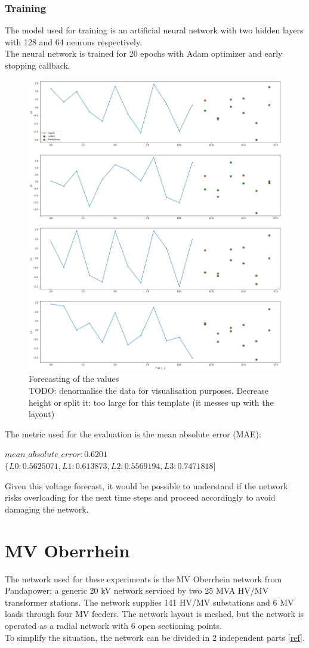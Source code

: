 \subsubsection{Training}
The model used for training is an artificial neural network with two hidden layers with 128 and 64 neurons respectively.\\
The neural network is trained for 20 epochs with Adam optimizer and early stopping callback.

\begin{figure}[H]
    \centering
    \includegraphics[width=.5\linewidth]{images/GYM-ANM/DATASET PLOTS/lines_forecasting.png}
    \caption[GYM-ANM forecasting]{Forecasting of the values \\
    TODO: denormalise the data for visualisation purposes. Decrease height or split it: too large for this template (it messes up with the layout)}
    \label{fig:net_sit3}
\end{figure}

\noindent The metric used for the evaluation is the mean absolute error (\gls{MAE}):
\begin{algorithmic}
\State $mean\_absolute\_error: 0.6201$
\State $\{L0:0.5625071, L1:0.613873 , L2:0.5569194, L3:0.7471818]$
\end{algorithmic}

\noindent Given this voltage forecast, it would be possible to understand if the network risks overloading for the next time steps and proceed accordingly to avoid damaging the network.



\section{MV Oberrhein}
\label{sec:MVober}
The network used for these experiments is the MV Oberrhein network from Pandapower; a generic 20 kV network serviced by two 25 MVA HV/MV transformer stations. The network supplies 141 HV/MV substations and 6 MV loads through four MV feeders. The network layout is meshed, but the network is operated as a radial network with 6 open sectioning points. \\
To simplify the situation, the network can be divided in 2 independent parts [\href{https://kobra.uni-kassel.de/bitstream/handle/123456789/12005/kup_9783737608725.pdf?sequence=1&isAllowed=y}{ref}].

